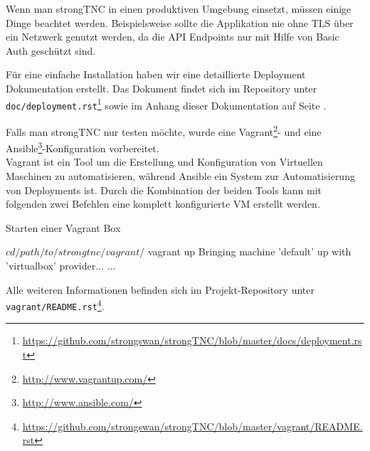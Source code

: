 Wenn man strongTNC in einen produktiven Umgebung einsetzt, müssen einige Dinge
beachtet werden. Beispielsweise sollte die Applikation nie ohne TLS über ein Netzwerk genutzt werden, da die API Endpoints nur mit Hilfe von Basic
Auth geschützt sind.

Für eine einfache Installation haben wir eine detaillierte Deployment Dokumentation erstellt. Das Dokument findet sich im Repository unter
\texttt{doc/deployment.rst}\footnote{\url{https://github.com/strongswan/strongTNC/blob/master/docs/deployment.rst}}
sowie im Anhang dieser Dokumentation auf Seite
\pageref{anhang:deployment-manual}.

Falls man strongTNC nur testen möchte, wurde eine
Vagrant\footnote{\url{http://www.vagrantup.com/}}- und eine
Ansible\footnote{\url{http://www.ansible.com/}}-Konfiguration vorbereitet.\\
Vagrant ist ein Tool um die Erstellung und Konfiguration von Virtuellen
Maschinen zu automatisieren, während Ansible ein System zur Automatisierung von
Deployments ist. Durch die Kombination der beiden Tools kann mit folgenden zwei
Befehlen eine komplett konfigurierte VM erstellt werden.

\begin{listing}[H]
\caption{Starten einer Vagrant Box}
\begin{textcode}
$ cd /path/to/strongtnc/vagrant/
$ vagrant up
Bringing machine 'default' up with 'virtualbox' provider...
...
\end{textcode}
\end{listing}

Alle weiteren Informationen befinden sich im Projekt-Repository unter
\texttt{vagrant/README.rst}\footnote{\url{https://github.com/strongswan/strongTNC/blob/master/vagrant/README.rst}}.

